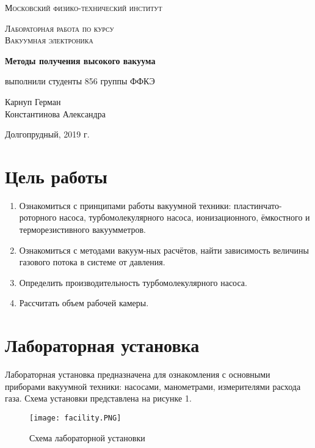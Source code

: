 \documentclass{article}
\begin{document}
\begin{titlepage}
	\centering
	{\scshape\LARGE Московский физико-технический институт \par}
	\vspace{3cm}
	{\scshape\Large Лабораторная работа по курсу\\ Вакуумная электроника \par}
	\vspace{1cm}
	{\huge\bfseries Методы получения высокого вакуума \par}
	\vspace{1cm}
	\vfill
\begin{flushright}
	{\large выполнили студенты 856 группы ФФКЭ}\par
	\vspace{0.3cm}
	{\LARGE Карнуп Герман}\\
	{\LARGE Константинова Александра} %
\end{flushright}

	\vfill

Долгопрудный, 2019 г.
\end{titlepage}
\newpage

\tableofcontents


\section{Цель работы}
\begin{enumerate}
    \item Ознакомиться с принципами работы вакуумной техники: пластинчато-роторного насоса, турбомолекулярного насоса, ионизационного, ёмкостного и терморезистивного вакуумметров.
    \item Ознакомиться с методами вакуум-ных расчётов, найти зависимость величины газового потока в системе от давления.
    \item Определить производительность турбомолекулярного насоса.
    \item Рассчитать объем рабочей камеры.
\end{enumerate}

\section{Лабораторная установка}

Лабораторная установка предназначена для ознакомления с основными приборами вакуумной техники: насосами, манометрами, измерителями расхода газа. Схема установки представлена на рисунке 1.
\begin{figure}[h]
    \centering
    \texttt{[image: facility.PNG]}
    \caption{Схема лабораторной установки}
    \label{fig:vac}
\end{figure}
\end{document}
